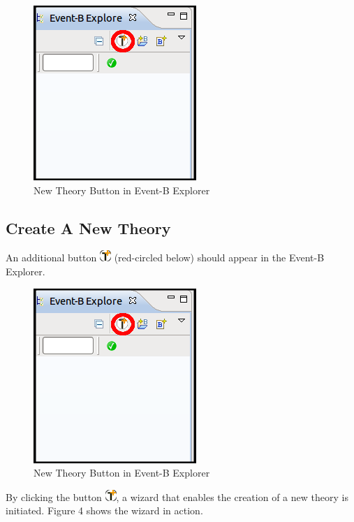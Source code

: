\begin{center}
\begin{figure}
\label{newTFW}
\includegraphics{images/NewTheoryButton.png}
\caption{New Theory Button in Event-B Explorer}
\end{figure}
\end{center}

\subsection{Create A New Theory}
An additional button \includegraphics{images/newThy.png} (red-circled below) should appear in the Event-B Explorer.

\begin{center}
\begin{figure}
\label{newTFW}
\includegraphics{images/NewTheoryButton.png}
\caption{New Theory Button in Event-B Explorer}
\end{figure}
\end{center}

\par 
By clicking the button \includegraphics{images/newThy.png}, a wizard that enables the creation of a new theory is initiated. Figure 4 shows the wizard in action.

